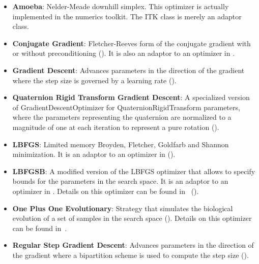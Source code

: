 \begin{itemize}

\item \textbf{Amoeba}: Nelder-Meade downhill simplex.  This optimizer is
actually implemented in the  numerics toolkit.  The ITK class
 is merely an adaptor class.

\item \textbf{Conjugate Gradient}: Fletcher-Reeves form 
of the conjugate gradient with or without preconditioning
(). It is also an adaptor to an optimizer in
.

\item \textbf{Gradient Descent}: Advances parameters in the direction of the
gradient where the step size is governed by a learning rate
(). 

\item \textbf{Quaternion Rigid Transform Gradient Descent}: A specialized
version of GradientDescentOptimizer for QuaternionRigidTransform parameters,
where the parameters representing the quaternion are normalized to a magnitude
of one at each iteration to represent a pure rotation
().

\item \textbf{LBFGS}: Limited memory Broyden, Fletcher, Goldfarb
and Shannon minimization. It is an adaptor to an optimizer in 
().

\item \textbf{LBFGSB}: A modified version of the LBFGS optimizer that allows to
specify bounds for the parameters in the search space.  It is an adaptor to an
optimizer in . Details on this optimizer can be found
in~\cite{Byrd1995,Zhu1997} ().

\item \textbf{One Plus One Evolutionary}: Strategy that simulates the
biological evolution of a set of samples in the search space (). Details on this optimizer can be
found in~\cite{Styner2000}.

\item \textbf{Regular Step Gradient Descent}: Advances parameters in the
direction of the gradient where a bipartition scheme is used to compute
the step size (). 


\end{itemize}
